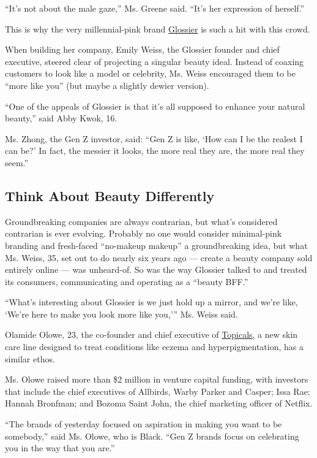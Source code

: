 ``It's not about the male gaze,'' Ms. Greene said. ``It's her expression
of herself.''

This is why the very millennial-pink brand
\href{https://www.skincarebyhyram.com/}{Glossier} is such a hit with
this crowd.

When building her company, Emily Weiss, the Glossier founder and chief
executive, steered clear of projecting a singular beauty ideal. Instead
of coaxing customers to look like a model or celebrity, Ms. Weiss
encouraged them to be ``more like you'' (but maybe a slightly dewier
version).

``One of the appeals of Glossier is that it's all supposed to enhance
your natural beauty,'' said Abby Kwok, 16.

Ms. Zhong, the Gen Z investor, said: ``Gen Z is like, `How can I be the
realest I can be?' In fact, the messier it looks, the more real they
are, the more real they seem.''

\hypertarget{think-about-beauty-differently}{%
\subsection{Think About Beauty
Differently}\label{think-about-beauty-differently}}

Groundbreaking companies are always contrarian, but what's considered
contrarian is ever evolving. Probably no one would consider minimal-pink
branding and fresh-faced ``no-makeup makeup'' a groundbreaking idea, but
what Ms. Weiss, 35, set out to do nearly six years ago --- create a
beauty company sold entirely online --- was unheard-of. So was the way
Glossier talked to and treated its consumers, communicating and
operating as a ``beauty BFF.''

``What's interesting about Glossier is we just hold up a mirror, and
we're like, `We're here to make you look more like you,''' Ms. Weiss
said.

Olamide Olowe, 23, the co-founder and chief executive of
\href{https://www.mytopicals.com/}{Topicals,} a new skin care line
designed to treat conditions like eczema and hyperpigmentation, has a
similar ethos.

Ms. Olowe raised more than \$2 million in venture capital funding, with
investors that include the chief executives of Allbirds, Warby Parker
and Casper; Issa Rae; Hannah Bronfman; and Bozoma Saint John, the chief
marketing officer of Netflix.

``The brands of yesterday focused on aspiration in making you want to be
somebody,'' said Ms. Olowe, who is Black. ``Gen Z brands focus on
celebrating you in the way that you are.''

